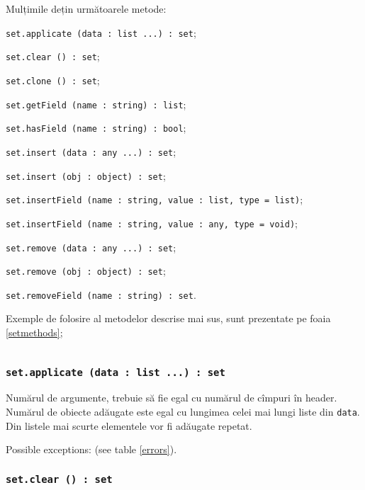Mulțimile dețin următoarele metode:
\begin{icItems}
\item \texttt{set.applicate (data : list ...) : set};
\item \texttt{set.clear () : set};
\item \texttt{set.clone () : set};
\item \texttt{set.getField (name : string) : list};
\item \texttt{set.hasField (name : string) : bool};
\item \texttt{set.insert (data : any ...) : set};
\item \texttt{set.insert (obj : object) : set};
\item \texttt{set.insertField (name : string, value : list, type = list)};
\item \texttt{set.insertField (name : string, value : any, type = void)};
\item \texttt{set.remove (data : any ...) : set};
\item \texttt{set.remove (obj : object) : set};
\item \texttt{set.removeField (name : string) : set}.
\end{icItems}

Exemple de folosire al metodelor descrise mai sus, sunt prezentate pe foaia \ref{setmethods};

\begin{sourcecode}
    \label{setmethods}
    \inputminted[linenos]{icl}{../sources/setmethods.icL}
\end{sourcecode}

\subsubsection{\texttt{set.applicate (data : list ...) : set}}

Numărul de argumente, trebuie să fie egal cu numărul de cîmpuri în header. Numărul de obiecte adăugate este egal cu lungimea celei mai lungi liste din \texttt{data}. Din listele mai scurte elementele vor fi adăugate repetat.

Possible exceptions:  (see table \ref{errors}).

\subsubsection{\texttt{set.clear () : set}}

